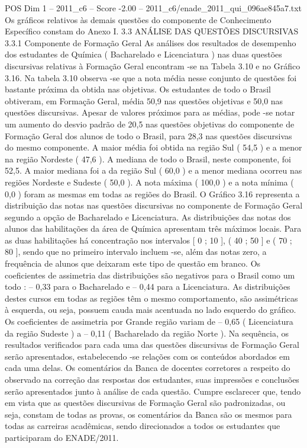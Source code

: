 \begin{textsample}{POS Dim 1 – 2011\_c6 – Score -2.00 – 2011\_c6/enade\_2011\_qui\_096ae845a7.txt}
Os gráficos relativos às demais questões do componente de Conhecimento Específico constam do Anexo I. 3.3 ANÁLISE DAS QUESTÕES DISCURSIVAS 3.3.1 Componente de Formação Geral As análises dos resultados de desempenho dos estudantes de Química ( Bacharelado e Licenciatura ) nas duas questões discursivas relativas à Formação Geral encontram -se na Tabela 3.10 e no Gráfico 3.16.
Na tabela 3.10 observa -se que a nota média nesse conjunto de questões foi bastante próxima da obtida nas objetivas.
Os estudantes de todo o Brasil obtiveram, em Formação Geral, média 50,9 nas questões objetivas e 50,0 nas questões discursivas.
Apesar de valores próximos para as médias, pode -se notar um aumento do desvio padrão de 20,5 nas questões objetivas do componente de Formação Geral dos alunos de todo o Brasil, para 28,3 nas questões discursivas do mesmo componente.
A maior média foi obtida na região Sul ( 54,5 ) e a menor na região Nordeste ( 47,6 ).
A mediana de todo o Brasil, neste componente, foi 52,5.
A maior mediana foi a da região Sul ( 60,0 ) e a menor mediana ocorreu nas regiões Nordeste e Sudeste ( 50,0 ).
A nota máxima ( 100,0 ) e a nota mínima ( 0,0 ) foram as mesmas em todas as regiões do Brasil.
O Gráfico 3.16 representa a distribuição das notas nas questões discursivas no componente de Formação Geral segundo a opção de Bacharelado e Licenciatura.
As distribuições das notas dos alunos das habilitações da área de Química apresentam três máximos locais.
Para as duas habilitações há concentração nos intervalos [ 0 ; 10 ], ( 40 ; 50 ] e ( 70 ; 80 ], sendo que no primeiro intervalo incluem -se, além das notas zero, a frequência de alunos que deixaram este tipo de questão em branco.
Os coeficientes de assimetria das distribuições são negativos para o Brasil como um todo : – 0,33 para o Bacharelado e – 0,44 para a Licenciatura.
As distribuições destes cursos em todas as regiões têm o mesmo comportamento, são assimétricas à esquerda, ou seja, possuem cauda mais acentuada no lado esquerdo do gráfico.
Os coeficientes de assimetria por Grande região variam de – 0,65 ( Licenciatura da região Sudeste ) a – 0,11 ( Bacharelado da região Norte ).
Na sequência, os resultados verificados para cada uma das questões discursivas de Formação Geral serão apresentados, estabelecendo -se relações com os conteúdos abordados em cada uma delas.
Os comentários da Banca de docentes corretores a respeito do observado na correção das respostas dos estudantes, suas impressões e conclusões serão apresentados junto à análise de cada questão.
Cumpre esclarecer que, tendo em vista que as questões discursivas de Formação Geral são padronizadas, ou seja, constam de todas as provas, os comentários da Banca são os mesmos para todas as carreiras acadêmicas, sendo direcionados a todos os estudantes que participaram do ENADE/2011.

\end{textsample}

